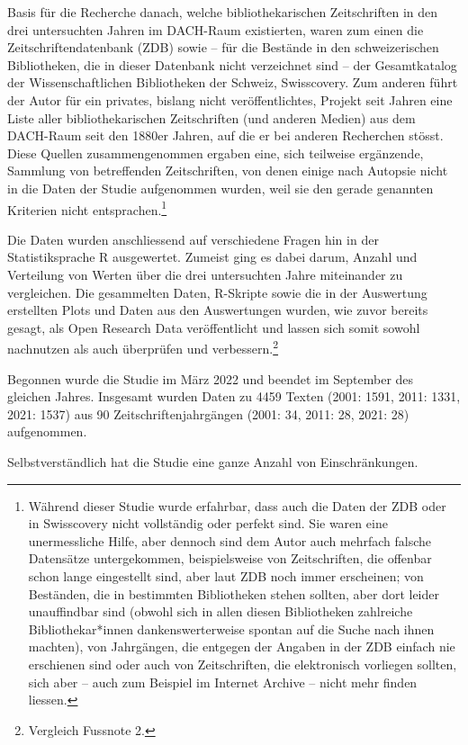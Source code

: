 \documentclass[a4paper,
fontsize=11pt,
oneside,
numbers=noperiodatend,
parskip=half-,
bibliography=totoc,
final
]{scrartcl}
\begin{document}
Basis für die Recherche danach, welche bibliothekarischen Zeitschriften
in den drei untersuchten Jahren im DACH-Raum existierten, waren zum
einen die Zeitschriftendatenbank (ZDB) sowie -- für die Bestände in den
schweizerischen Bibliotheken, die in dieser Datenbank nicht verzeichnet
sind -- der Gesamtkatalog der Wissenschaftlichen Bibliotheken der
Schweiz, Swisscovery. Zum anderen führt der Autor für ein privates,
bislang nicht veröffentlichtes, Projekt seit Jahren eine Liste aller
bibliothekarischen Zeitschriften (und anderen Medien) aus dem DACH-Raum
seit den 1880er Jahren, auf die er bei anderen Recherchen stösst. Diese
Quellen zusammengenommen ergaben eine, sich teilweise ergänzende,
Sammlung von betreffenden Zeitschriften, von denen einige nach Autopsie
nicht in die Daten der Studie aufgenommen wurden, weil sie den gerade
genannten Kriterien nicht entsprachen.\footnote{Während dieser Studie
  wurde erfahrbar, dass auch die Daten der ZDB oder in Swisscovery nicht
  vollständig oder perfekt sind. Sie waren eine unermessliche Hilfe,
  aber dennoch sind dem Autor auch mehrfach falsche Datensätze
  untergekommen, beispielsweise von Zeitschriften, die offenbar schon
  lange eingestellt sind, aber laut ZDB noch immer erscheinen; von
  Beständen, die in bestimmten Bibliotheken stehen sollten, aber dort
  leider unauffindbar sind (obwohl sich in allen diesen Bibliotheken
  zahlreiche Bibliothekar*innen dankenswerterweise spontan auf die Suche
  nach ihnen machten), von Jahrgängen, die entgegen der Angaben in der
  ZDB einfach nie erschienen sind oder auch von Zeitschriften, die
  elektronisch vorliegen sollten, sich aber -- auch zum Beispiel im
  Internet Archive -- nicht mehr finden liessen.}

Die Daten wurden anschliessend auf verschiedene Fragen hin in der
Statistiksprache R ausgewertet. Zumeist ging es dabei darum, Anzahl und
Verteilung von Werten über die drei untersuchten Jahre miteinander zu
vergleichen. Die gesammelten Daten, R-Skripte sowie die in der
Auswertung erstellten Plots und Daten aus den Auswertungen wurden, wie
zuvor bereits gesagt, als Open Research Data veröffentlicht und lassen
sich somit sowohl nachnutzen als auch überprüfen und
verbessern.\footnote{Vergleich Fussnote 2.}

Begonnen wurde die Studie im März 2022 und beendet im September des
gleichen Jahres. Insgesamt wurden Daten zu 4459 Texten (2001: 1591,
2011: 1331, 2021: 1537) aus 90 Zeitschriftenjahrgängen (2001: 34, 2011:
28, 2021: 28) aufgenommen.

Selbstverständlich hat die Studie eine ganze Anzahl von Einschränkungen.
\end{document}
